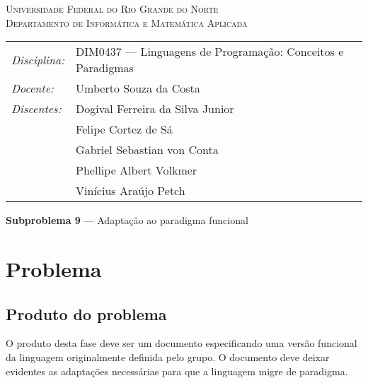 \documentclass[12pt, a4paper]{article}
\begin{document}
\begin{center}
    \textsc{Universidade Federal do Rio Grande do Norte} \\
    \textsc{Departamento de Informática e Matemática Aplicada}
\end{center}

\bigskip

\begin{tabular}{@{}ll@{}}
    \emph{Disciplina:} & DIM0437 --- Linguagens de Programação:
                            Conceitos e Paradigmas \\
    \emph{Docente:}    & Umberto Souza da Costa \\
    \emph{Discentes:}  & Dogival Ferreira da Silva Junior \\
                       & Felipe Cortez de Sá \\
                       & Gabriel Sebastian von Conta \\
                       & Phellipe Albert Volkmer \\
                       & Vinícius Araújo Petch
\end{tabular}

\bigskip

\begin{center}
\large \textbf{Subproblema 9} --- Adaptação ao paradigma funcional
\end{center}

\section{Problema}
    \subsection{Produto do problema}
    O produto desta fase deve ser um documento especificando uma versão
    funcional da linguagem originalmente definida pelo grupo. O documento deve
    deixar evidentes as adaptações necessárias para que a linguagem migre de
    paradigma.
\end{document}
